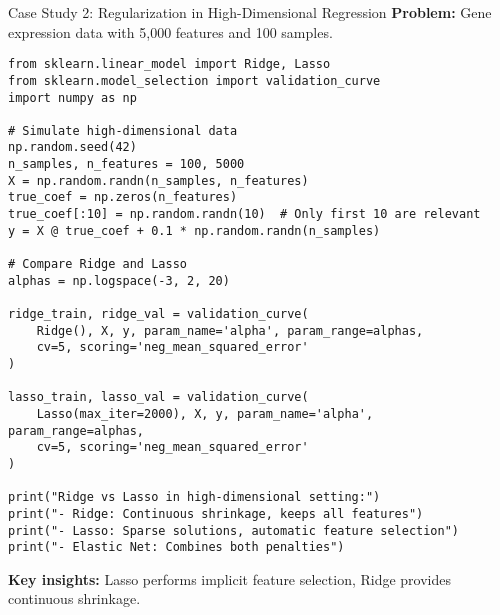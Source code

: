 \documentclass[aspectratio=169,11pt]{beamer}
\begin{document}
\begin{frame}[fragile]{Case Study 2: Regularization in High-Dimensional Regression}
\textbf{Problem:} Gene expression data with 5{,}000 features and 100 samples.

\begin{lstlisting}[basicstyle=\ttfamily\tiny]
from sklearn.linear_model import Ridge, Lasso
from sklearn.model_selection import validation_curve
import numpy as np

# Simulate high-dimensional data
np.random.seed(42)
n_samples, n_features = 100, 5000
X = np.random.randn(n_samples, n_features)
true_coef = np.zeros(n_features)
true_coef[:10] = np.random.randn(10)  # Only first 10 are relevant
y = X @ true_coef + 0.1 * np.random.randn(n_samples)

# Compare Ridge and Lasso
alphas = np.logspace(-3, 2, 20)

ridge_train, ridge_val = validation_curve(
    Ridge(), X, y, param_name='alpha', param_range=alphas,
    cv=5, scoring='neg_mean_squared_error'
)

lasso_train, lasso_val = validation_curve(
    Lasso(max_iter=2000), X, y, param_name='alpha', param_range=alphas,
    cv=5, scoring='neg_mean_squared_error'
)

print("Ridge vs Lasso in high-dimensional setting:")
print("- Ridge: Continuous shrinkage, keeps all features")
print("- Lasso: Sparse solutions, automatic feature selection")
print("- Elastic Net: Combines both penalties")
\end{lstlisting}

\textbf{Key insights:} Lasso performs implicit feature selection, Ridge provides continuous shrinkage.
\end{frame}
\end{document}
